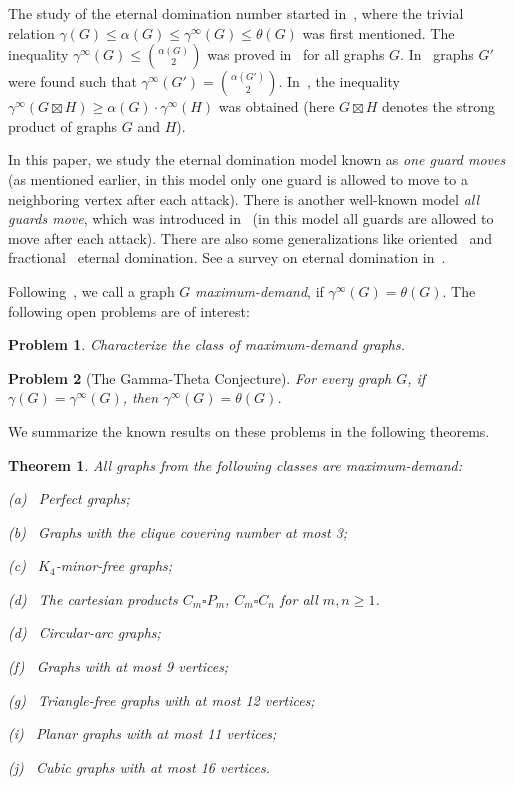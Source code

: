 \documentclass[12pt]{article}
\newtheorem{theorem}{Theorem}
\newtheorem{conjecture}{Problem}
\begin{document}
The study of the eternal domination number started in~\cite{BCGMVW04}, where the trivial relation $\gamma(G) \leq \alpha(G) \leq \gamma^{\infty}(G) \leq \theta(G)$ was first mentioned. The inequality $\gamma^{\infty}(G) \leq \binom{\alpha(G)}{2}$ was proved in~\cite{KM07} for all graphs $G$. In~\cite{GK08} graphs $G'$ were found such that $\gamma^{\infty}(G') = \binom{\alpha(G')}{2}$. In~\cite{DKKM20}, the inequality $\gamma^{\infty}(G \boxtimes H) \geq \alpha(G) \cdot \gamma^{\infty}(H)$ was obtained (here $G \boxtimes H$ denotes the strong product of graphs $G$ and $H$). 

In this paper, we study the eternal domination model known as \textit{one guard moves} (as mentioned earlier, in this model only one guard is allowed to move to a neighboring vertex after each attack). There is another well-known model \textit{all guards move}, which was introduced in~\cite{GHH05} (in this model all guards are allowed to move after each attack). There are also some generalizations like oriented~\cite{BJK21} and fractional~\cite{DKKMS23}  eternal domination. See a survey on eternal domination in~\cite{KM20}.

Following~\cite{ABBCVY07}, we call a graph $G$  \textit{maximum-demand}, if $\gamma^{\infty}(G) = \theta(G)$. The following open problems are of interest:

\begin{conjecture}
Characterize the class of maximum-demand graphs.
\end{conjecture} 

\begin{conjecture}[The Gamma-Theta Conjecture]
For every graph $G$, if $\gamma(G) = \gamma^{\infty}(G)$, then $\gamma^{\infty}(G) = \theta(G)$.
\end{conjecture} 

We summarize the known results on these problems in the following theorems.

\begin{theorem}
All graphs from the following classes are maximum-demand:

(a) \cite{BCGMVW04}~Perfect graphs;

(b) \cite{BCGMVW04}~Graphs with the clique covering number at most 3;

(c) \cite{ABBCVY07}~$K_4$-minor-free graphs;

(d) \cite{ABBCVY07}~The cartesian products $C_m \square P_m$, $C_m \square C_n$ for all $m,n \geq 1$.

(d) \cite{R07}~Circular-arc graphs;

(f) \cite{MMV22}~Graphs with at most 9 vertices;

(g) \cite{MMV22}~Triangle-free graphs with at most 12 vertices;

(i) \cite{MMV22}~Planar graphs with at most 11 vertices;

(j) \cite{MMV22}~Cubic graphs with at most 16 vertices.
\end{theorem}
\end{document}
